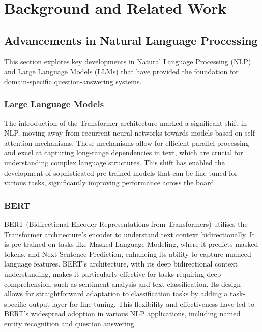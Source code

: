 

\chapter{Background and Related Work}

\section{Advancements in Natural Language Processing}

This section explores key developments in Natural Language Processing (NLP) and Large Language Models (LLMs) that have provided the foundation for domain-specific question-answering systems.

\subsection{Large Language Models}

The introduction of the Transformer architecture \cite{vaswani2023attention} marked a significant shift in NLP, moving away from recurrent neural networks towards models based on self-attention mechanisms. These mechanisms allow for efficient parallel processing and excel at capturing long-range dependencies in text, which are crucial for understanding complex language structures. This shift has enabled the development of sophisticated pre-trained models that can be fine-tuned for various tasks, significantly improving performance across the board.

\subsection{BERT}

BERT (Bidirectional Encoder Representations from Transformers) \cite{devlin2019bertpretrainingdeepbidirectional} utilises the Transformer architecture's encoder to understand text context bidirectionally. It is pre-trained on tasks like Masked Language Modeling, where it predicts masked tokens, and Next Sentence Prediction, enhancing its ability to capture nuanced language features. BERT's architecture, with its deep bidirectional context understanding, makes it particularly effective for tasks requiring deep comprehension, such as sentiment analysis and text classification. Its design allows for straightforward adaptation to classification tasks by adding a task-specific output layer for fine-tuning. This flexibility and effectiveness have led to BERT's widespread adoption in various NLP applications, including named entity recognition and question answering.

